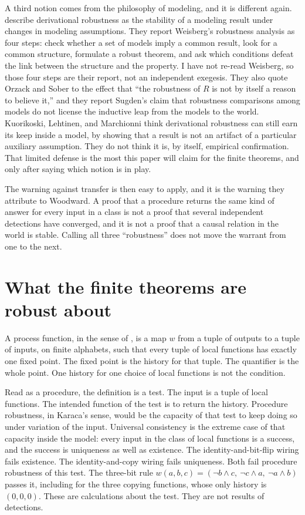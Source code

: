 \documentclass[12pt]{article}
\begin{document}
A third notion comes from the philosophy of modeling, and it is different again. \citet{kuorikoski2007} describe derivational robustness as the stability of a modeling result under changes in modeling assumptions. They report Weisberg's robustness analysis as four steps: check whether a set of models imply a common result, look for a common structure, formulate a robust theorem, and ask which conditions defeat the link between the structure and the property. I have not re-read Weisberg, so those four steps are their report, not an independent exegesis. They also quote Orzack and Sober to the effect that ``the robustness of \(R\) is not by itself a reason to believe it,'' and they report Sugden's claim that robustness comparisons among models do not license the inductive leap from the models to the world. Kuorikoski, Lehtinen, and Marchionni think derivational robustness can still earn its keep inside a model, by showing that a result is not an artifact of a particular auxiliary assumption. They do not think it is, by itself, empirical confirmation. That limited defense is the most this paper will claim for the finite theorems, and only after saying which notion is in play.

The warning against transfer is then easy to apply, and it is the warning they attribute to Woodward. A proof that a procedure returns the same kind of answer for every input in a class is not a proof that several independent detections have converged, and it is not a proof that a causal relation in the world is stable. Calling all three ``robustness'' does not move the warrant from one to the next.

\section{What the finite theorems are robust about}
\label{sec:math}

A process function, in the sense of \citet{baumeler2016}, is a map \(w\) from a tuple of outputs to a tuple of inputs, on finite alphabets, such that every tuple of local functions has exactly one fixed point. The fixed point is the history for that tuple. The quantifier is the whole point. One history for one choice of local functions is not the condition.

Read as a procedure, the definition is a test. The input is a tuple of local functions. The intended function of the test is to return the history. Procedure robustness, in Karaca's sense, would be the capacity of that test to keep doing so under variation of the input. Universal consistency is the extreme case of that capacity inside the model: every input in the class of local functions is a success, and the success is uniqueness as well as existence. The identity-and-bit-flip wiring fails existence. The identity-and-copy wiring fails uniqueness. Both fail procedure robustness of this test. The three-bit rule \(w(a,b,c)=(\lnot b\land c,\ \lnot c\land a,\ \lnot a\land b)\) passes it, including for the three copying functions, whose only history is \((0,0,0)\). These are calculations about the test. They are not results of detections.
\end{document}
